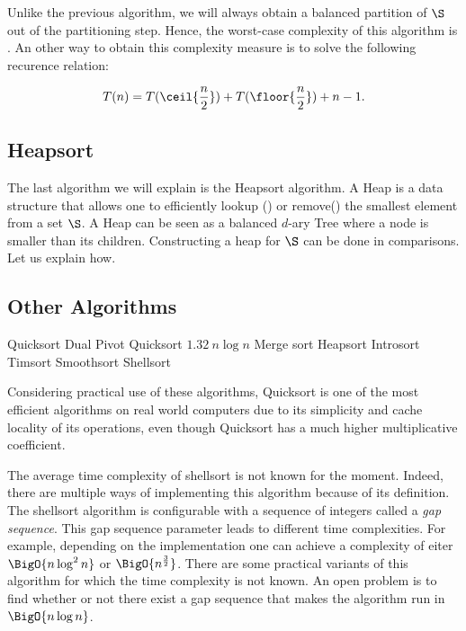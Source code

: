 Unlike the previous algorithm, we will always obtain a balanced partition of
\(\S\) out of the partitioning step. Hence, the worst-case complexity of this
algorithm is . An other way to obtain this complexity measure
is to solve the following recurence relation:

\begin{displaymath}
T(n) = T(\ceil{\frac{n}{2}}) + T(\floor{\frac{n}{2}}) + n - 1.
\end{displaymath}

\subsection*{Heapsort}

The last algorithm we will explain is the Heapsort algorithm. A Heap is a data
structure that allows one to efficiently lookup () or
remove(\BigO{\log \card{\S}}) the smallest element from a set \(\S\). A Heap can
be seen as a balanced \(d\)-ary Tree where a node is smaller than its
children. Constructing a heap for \(\S\) can be done in \BigO{\S} comparisons.
Let us explain how.

\subsection*{Other Algorithms}

Quicksort \cite{hoare:1962}
Dual Pivot Quicksort \(1.32~n \log n\) \cite{yaroslavskiy:2009}
Merge sort  \cite{leiserson:2001,goldstine:1948}
Heapsort  \cite{leiserson:2001}
Introsort  \cite{musser:1997}
Timsort \cite{martelli:2006}
Smoothsort \cite{dijkstra:1982}
Shellsort \cite{shell:1959}

Considering practical use of these algorithms, Quicksort is one of the most
efficient algorithms on real world computers due to its simplicity and cache
locality of its operations, even though Quicksort has a much higher
multiplicative coefficient.

The average time complexity of shellsort is not known for the moment. Indeed,
there are multiple ways of implementing this algorithm because of its
definition. The shellsort algorithm is configurable with a sequence of integers
called a \emph{gap sequence}. This gap sequence parameter leads to different
time complexities. For example, depending on the implementation one can achieve
a complexity of eiter $\BigO{n \log^2 n}$ or $\BigO{n^{\frac{3}{2}}}$. There
are some practical variants of this algorithm for which the time complexity is
not known. An open problem is to find whether or not there exist a gap sequence
that makes the algorithm run in $\BigO{n \log n}$.

